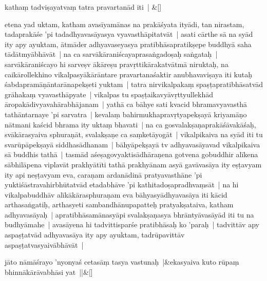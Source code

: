 \documentclass[article,a4paper]{memoir}
\begin{document}
	    
	    \stanza[\smallbreak]
kathaṃ tadviṣayatvaṃ tatra pravartanā\-d iti | \&[\smallbreak]


	

	  \pstart etena yad uktam, katham avasī\-yamā\-nas  na prakā\-śyata ityā\-di, tan nirastam, tadaprakā\-śe 'pi tadadhyavasā\-yasya vyavasthā\-pitatvā\-t | asati cā\-rthe sā\- na syā\-d ity apy ayuktam, ā\-tmā\-der adhyavaseyasya pratibhā\-sapratikṣepe buddhyā\- saha tā\-dā\-tmyā\-bhā\-vā\-t | na ca sarvā\-kā\-raniścayaprasaṅgadoṣaḥ saṅgataḥ | sarvā\-kā\-raniścayo hi sarveṣv ā\-kā\-reṣu pravṛttikā\-rakatvā\-tmā\- niruktaḥ, na caikā\-rollekhino vikalpasyā\-kā\-rā\-ntare pravartanaśaktir anubhavaviṣaya iti kutaḥ śabdapramā\-ṇā\-ntarā\-napekṣeti yuktam | tatra nirvikalpakaṃ spaṣṭapratibhā\-satvā\-d grā\-hakaṃ vyavasthā\-pyate | vikalpas tu spaṣṭaikavyā\-vṛttyullekhā\-d ā\-ropakā\-divyavahā\-rabhā\-janam | yathā\- ca bā\-hye sati kvacid bhramavyavasthā\- tathā\-ntarnaye 'pi sarvatra | kevalaṃ bahirmukhapravṛtyapekṣayā\- kriyamā\-ṇo nā\-tmani kaścid bhrama ity uktaṃ bhavati | na ca gosvalakṣaṇaprakā\-śā\-vakā\-śaḥ, svā\-kā\-rasyaiva sphuraṇā\-t, svalakṣaṇe ca saṃketā\-yogā\-t | vikalpikaiva na syā\-d iti tu svarū\-pā\-pekṣayā\- siddhasā\-dhanam | bā\-hyā\-pekṣayā\- tv adhyavasā\-yavad vikalpikaiva sā\- buddhis tathā\- | tasmā\-d aśeṣagovyaktisā\-dhā\-raṇena gotvena gobuddhir alī\-kena sā\-bhilā\-pena viplavā\-t prakhyā\-tī\-ti tathā\- prakhyā\-nam asyā\- gavā\-vasā\-ya ity eṣṭavyam ity api neṣṭavyam eva, caraṇam ardanā\-dinā\- pratyavasthā\-ne 'pi yuktiśā\-stravahirbhū\-tatvā\-d etadabhā\-ve 'pi kathitadoṣapradhvaṃsā\-t | na hi vikalpabuddhā\-v alī\-kā\-kā\-rasphuraṇam eva bā\-hyasyā\-dhyavasā\-ya iti kā\-cid arthasaṅgatiḥ, arthasyeti sambandhā\-nupapatteḥ  pratyakṣataiva, katham adhyavasā\-yaḥ | apratibhā\-samā\-nasyā\-pi svalakṣaṇasya bhrā\-ntyā\-vasā\-yā\-d iti tu na budhyā\-mahe | avasā\-yena hi tadvittisparśe pratibhā\-saḥ ko 'paraḥ | tadvittā\-v apy aspaṣṭatvā\-d adhyavasā\-ya ity apy ayuktam, tadrū\-pavittā\-v aspaṣṭatvasyaivā\-bhā\-vā\-t |
	\pend
      
	    
	    \stanza[\smallbreak]
jā\-to nā\-mā\-śrayo 'nyonyaś cetasā\-ṃ tasya vastunaḥ |&ekasyaiva kuto rū\-paṃ bhinnā\-kā\-rā\-vabhā\-si yat ||\&[\smallbreak]


	
\end{document}
